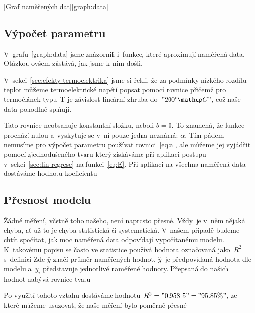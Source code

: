 [Graf naměřených dat][graph:data]

\subsection{Výpočet parametru}
V~grafu~\ref{graph:data} jsme znázornili i~funkce, které aproximují naměřená
data. Otázkou ovšem zůstává, jak jsme k~nim došli.

V~sekci~\ref{sec:efekty-termoelektrika} jsme si řekli, že za podmínky nízkého
rozdílu teplot můžeme termoelektrické napětí popsat pomocí rovnice
přičemž pro termočlánek typu~T je závislost lineární zhruba do~$"200 \C"$, což
naše data pohodlně splňují.~\cite{thermocoupleinfo}

Tato rovnice neobsahuje konstantní složku, neboli $b=0$. To znamená, že funkce
prochází nulou a~vyskytuje se v~ní pouze jedna neznámá: $\alpha$. Tím pádem
nemusíme pro výpočet parametru používat rovnici~\eqref{eq:a}, ale můžeme jej
vyjádřit pomocí zjednodušeného tvaru
který získáváme při aplikaci postupu v~sekci~\ref{sec:lin-regrese} na 
funkci~\eqref{eq:E}. Při aplikaci na všechna naměřená data dostáváme hodnotu
koeficientu

\subsection{Přesnost modelu}
Žádné měření, včetně toho našeho, není naprosto přesné. Vždy~je v~něm nějaká chyba,
ať už to je chyba statistická či systematická. V~našem případě budeme chtít 
spočítat, jak moc naměřená data odpovídají vypočítanému modelu. K~takovému
popisu se často ve statistice používá hodnota označovaná jako~$R^2$ s~definicí
Zde $\bar y$ značí průměr naměřených hodnot, $\hat y$~je  předpovídaná hodnota
dle modelu a~$y_i$ představuje jednotlivé naměřené hodnoty. Přepsaná do našich
hodnot nabývá rovnice tvaru

Po využití tohoto vztahu dostáváme hodnotu~$R^2 = "0.958~5" = "95.85 \%"$, ze
které můžeme usuzovat, že naše měření bylo poměrně přesné

